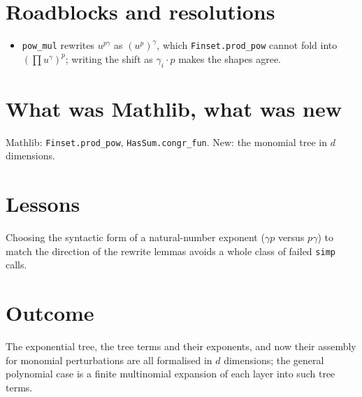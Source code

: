 \documentclass[11pt]{article}
\begin{document}
\section{Roadblocks and resolutions}
\begin{itemize}
\item \texttt{pow\_mul} rewrites $u^{p\gamma}$ as $(u^p)^\gamma$, which \texttt{Finset.prod\_pow} cannot
fold into $(\prod u^\gamma)^p$; writing the shift as $\gamma_i\cdot p$ makes the shapes agree.
\end{itemize}

\section{What was Mathlib, what was new}
Mathlib: \texttt{Finset.prod\_pow}, \texttt{HasSum.congr\_fun}. New: the monomial tree in $d$
dimensions.

\section{Lessons}
Choosing the syntactic form of a natural-number exponent ($\gamma p$ versus $p\gamma$) to match the
direction of the rewrite lemmas avoids a whole class of failed \texttt{simp} calls.

\section{Outcome}
The exponential tree, the tree terms and their exponents, and now their assembly for monomial
perturbations are all formalised in $d$ dimensions; the general polynomial case is a finite multinomial
expansion of each layer into such tree terms.
\end{document}
